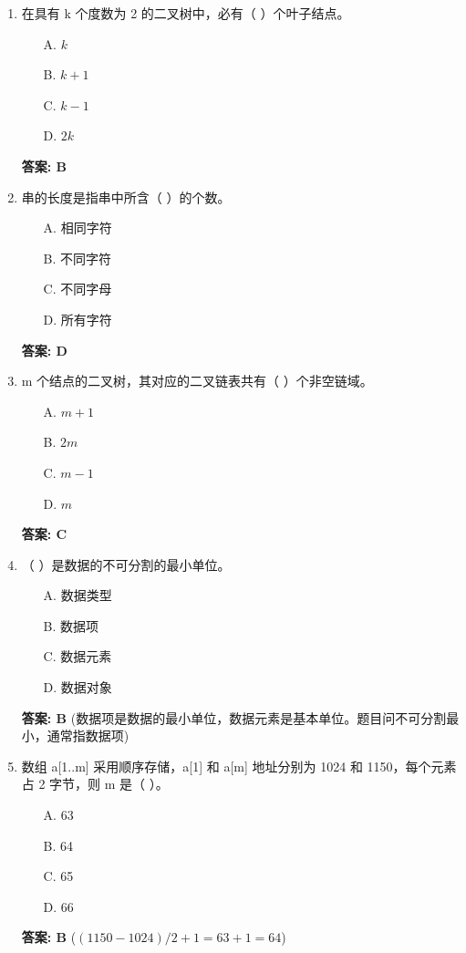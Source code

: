 \documentclass[12pt, a4paper]{article}
\begin{document}
\begin{enumerate}
    \item 在具有 k 个度数为 2 的二叉树中，必有（ ）个叶子结点。
    \begin{enumerate}
        \item[A.] $k$
        \item[B.] $k+1$
        \item[C.] $k-1$
        \item[D.] $2k$
    \end{enumerate}
    \textbf{答案: B}

    \item 串的长度是指串中所含（ ）的个数。
    \begin{enumerate}
        \item[A.] 相同字符
        \item[B.] 不同字符
        \item[C.] 不同字母
        \item[D.] 所有字符
    \end{enumerate}
    \textbf{答案: D}

    \item m 个结点的二叉树，其对应的二叉链表共有（ ）个非空链域。
    \begin{enumerate}
        \item[A.] $m+1$
        \item[B.] $2m$
        \item[C.] $m-1$
        \item[D.] $m$
    \end{enumerate}
    \textbf{答案: C}

    \item （ ）是数据的不可分割的最小单位。
    \begin{enumerate}
        \item[A.] 数据类型
        \item[B.] 数据项
        \item[C.] 数据元素
        \item[D.] 数据对象
    \end{enumerate}
    \textbf{答案: B} (数据项是数据的最小单位，数据元素是基本单位。题目问不可分割最小，通常指数据项)

    \item 数组 a[1..m] 采用顺序存储，a[1] 和 a[m] 地址分别为 1024 和 1150，每个元素占 2 字节，则 m 是（ ）。
    \begin{enumerate}
        \item[A.] 63
        \item[B.] 64
        \item[C.] 65
        \item[D.] 66
    \end{enumerate}
    \textbf{答案: B} ($(1150-1024)/2 + 1 = 63+1=64$)


\end{enumerate}
\end{document}
